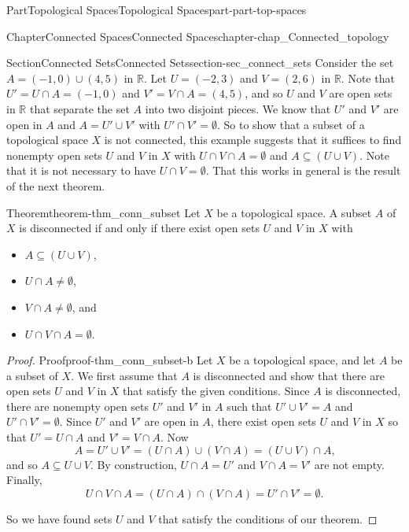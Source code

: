 \documentclass[oneside,10pt,]{book}
\numberwithin{equation}{chapter}
\newcommand{\R}{\mathbb{R}}
\begin{document}
\begin{partptx}{Part}{Topological Spaces}{}{Topological Spaces}{}{}{part-part-top-spaces}
\begin{chapterptx}{Chapter}{Connected Spaces}{}{Connected Spaces}{}{}{chapter-chap_Connected_topology}
\begin{sectionptx}{Section}{Connected Sets}{}{Connected Sets}{}{}{section-sec_connect_sets}
Consider the set \(A = (-1,0) \cup (4,5)\) in \(\R\). Let \(U = (-2,3)\) and \(V=(2,6)\) in \(\R\). Note that \(U' = U \cap A = (-1,0)\) and \(V' = V \cap A = (4,5)\), and so \(U\) and \(V\) are open sets in \(\R\) that separate the set \(A\) into two disjoint pieces. We know that \(U'\) and \(V'\) are open in \(A\) and \(A = U' \cup V'\) with \(U' \cap V' = \emptyset\). So to show that a subset of a topological space \(X\) is not connected, this example suggests that it suffices to find nonempty open sets \(U\) and \(V\) in \(X\) with \(U \cap V \cap A = \emptyset\) and \(A \subseteq (U \cup V)\). Note that it is not necessary to have \(U \cap V = \emptyset\). That this works in general is the result of the next theorem.%
\begin{theorem}{Theorem}{}{}{theorem-thm_conn_subset}%
Let \(X\) be a topological space. A subset \(A\) of \(X\) is disconnected if and only if there exist open sets \(U\) and \(V\) in \(X\) with%
\begin{itemize}[label=\textbullet]
\item{}\(A \subseteq (U \cup V)\),%
\item{}\(U \cap A \neq \emptyset\),%
\item{}\(V \cap A \neq \emptyset\), and%
\item{}\(U \cap V \cap A = \emptyset\).%
\end{itemize}
%
\end{theorem}
\begin{proof}{Proof}{}{proof-thm_conn_subset-b}
Let \(X\) be a topological space, and let \(A\) be a subset of \(X\). We first assume that \(A\) is disconnected and show that there are open sets \(U\) and \(V\) in \(X\) that satisfy the given conditions. Since \(A\) is disconnected, there are nonempty open sets \(U'\) and \(V'\) in \(A\) such that \(U' \cup V' = A\) and \(U' \cap V' = \emptyset\). Since \(U'\) and \(V'\) are open in \(A\), there exist open sets \(U\) and \(V\) in \(X\) so that \(U' = U \cap A\) and \(V' = V \cap A\). Now%
\begin{equation*}
A = U' \cup V' = (U \cap A) \cup (V \cap A) = (U \cup V) \cap A\text{,}
\end{equation*}
and so \(A \subseteq U \cup V\). By construction, \(U \cap A = U'\) and \(V \cap A = V'\) are not empty. Finally,%
\begin{equation*}
U \cap V \cap A = (U \cap A) \cap (V \cap A) = U' \cap V' = \emptyset\text{.}
\end{equation*}
%
\par
So we have found sets \(U\) and \(V\) that satisfy the conditions of our theorem.%

\end{proof}
\end{sectionptx}
\end{chapterptx}
\end{partptx}
\end{document}
